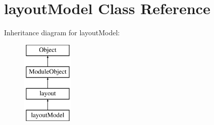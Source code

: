 \hypertarget{classlayoutModel}{\section{layout\-Model Class Reference}
\label{classlayoutModel}
}
Inheritance diagram for layout\-Model\-:\begin{figure}[H]
\begin{center}
\leavevmode
\includegraphics[height=4.000000cm]{classlayoutModel}
\end{center}
\end{figure}
